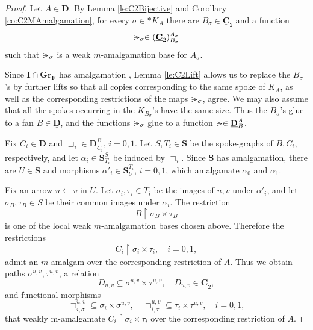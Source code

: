\documentclass[12pt]{amsart}
\numberwithin{equation}{section}
\theoremstyle{plain}
\theoremstyle{definition}
\newcommand{\nil}{\mathrel{\vphantom{>}\text{\mathsurround=0pt\ooalign{$>$\cr$-$\cr}}}}
\newcommand \sqsp{\sqsupset}
\newcommand \la{\leftarrow}
\newcommand \uhr{\upharpoonright}
\newcommand \GGRFb{\mathbf{Gr_F}}
\newcommand \IIb{\mathbf{I}}
\newcommand \SSb{\mathbf{S}}
\newcommand \CCub{\underline{\mathbf{C}}}
\newcommand \DDub{\underline{\mathbf{D}}}
\begin{document}
\begin{proof}
	Let $A\in\DDub$. By Lemma \ref{le:C2Bijective} and Corollary
	\ref{co:C2MAmalgamation}, for every $\sigma\in *K_A$ there are
	$B_\sigma\in\CCub_2$ and a function
	\[
	\nil_\sigma\in(\CCub_2)^{A_\sigma}_{B_\sigma}
	\]
	such that $\nil_\sigma$ is a weak $m$-amalgamation base for $A_\sigma$.
	
	Since $\IIb\cap\GGRFb$ has amalgamation
	\cite[Proposition~5.13]{BaBiVi2}, Lemma \ref{le:C2Lift} allows us to
	replace the $B_\sigma$'s by further lifts so that all copies
	corresponding to the same spoke of $K_A$, as well as the corresponding
	restrictions of the maps $\nil_\sigma$, agree. We may also assume that
	all the spokes occurring in the $K_{B_\sigma}$'s have the same size.
	Thus the $B_\sigma$'s glue to a fan $B\in\DDub$, and the functions
	$\nil_\sigma$ glue to a function $\nil\in\DDub^A_B$.
	
	
	Fix $C_i\in\DDub$ and $\sqsp_i\in\DDub^B_{C_i}$, $i=0,1$. Let $S,T_i\in\SSb$ be the spoke-graphs of $B,C_i$, respectively, and
	let $\alpha_i\in\SSb^S_{T_i}$ be induced by $\sqsp_i$. Since $\SSb$ has amalgamation, there are
	$U\in\SSb$ and morphisms $\alpha'_i\in\SSb^{T_i}_U$, $i=0,1$, which amalgamate $\alpha_0$ and $\alpha_1$.
	
	Fix an arrow $u\la v$ in $U$. Let $\sigma_i,\tau_i\in T_i$ be the
	images of $u,v$ under $\alpha'_i$, and let
	$\sigma_B,\tau_B\in S$ be their common images under $\alpha_i$.
	The restriction
	\[
	B\uhr\sigma_B\times\tau_B
	\]
	is one of the local weak $m$-amalgamation bases chosen above.
	Therefore the restrictions
	\[
	C_i\uhr\sigma_i\times\tau_i,\quad i=0,1,
	\]
	admit an $m$-amalgam over the corresponding restriction of $A$.
	Thus we obtain paths $\sigma^{u,v},\tau^{u,v}$, a relation
	\[
	D_{u,v}\subseteq\sigma^{u,v}\times\tau^{u,v},
	\quad D_{u,v}\in\CCub_2,
	\]
	and functional morphisms
	\[
	\sqsp^{u,v}_{i,\sigma}\subseteq
	\sigma_i\times\sigma^{u,v},
	\quad
	\sqsp^{u,v}_{i,\tau}\subseteq
	\tau_i\times\tau^{u,v},
	\quad i=0,1,
	\]
	that weakly m-amalgamate $C_i \uhr \sigma_i \times \tau_i$ over the corresponding
	restriction of $A$.
	

\end{proof}
\end{document}
